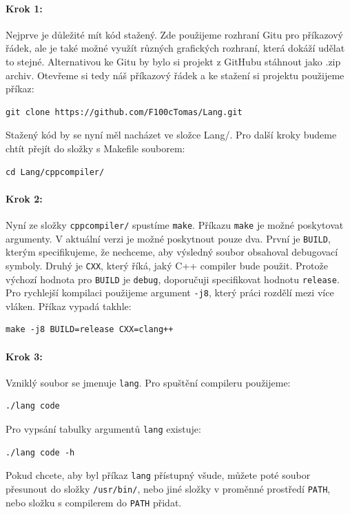 \documentclass[12pt, a4paper, titlepage, abstract=on]{scrreprt}
\begin{document}
\paragraph{Krok 1:}
Nejprve je důležité mít kód stažený. Zde použijeme rozhraní Gitu pro příkazový řádek, ale je také možné využít různých grafických rozhraní, která
dokáží udělat to stejné. Alternativou ke Gitu by bylo si projekt z GitHubu stáhnout jako .zip archiv. Otevřeme si tedy náš příkazový řádek a ke stažení si projektu použijeme příkaz:
\begin{verbatim}
git clone https://github.com/F100cTomas/Lang.git
\end{verbatim}
Stažený kód by se nyní měl nacházet ve složce Lang/. Pro další kroky budeme chtít přejít do složky s Makefile souborem:
\begin{verbatim}
cd Lang/cppcompiler/
\end{verbatim}
\paragraph{Krok 2:}
Nyní ze složky \texttt{cppcompiler/} spustíme \texttt{make}. Příkazu \texttt{make} je možné poskytovat argumenty. V aktuální verzi je možné
poskytnout pouze dva. První je \texttt{BUILD}, kterým specifikujeme, že nechceme, aby výsledný soubor obsahoval debugovací symboly.
Druhý je \texttt{CXX}, který říká, jaký C++ compiler bude použit. Protože výchozí hodnota pro \texttt{BUILD} je \texttt{debug}, doporučuji
specifikovat hodnotu \texttt{release}. Pro rychlejší kompilaci použijeme argument \texttt{-j8}, který práci rozdělí mezi více vláken. Příkaz
vypadá takhle:
\begin{verbatim}
make -j8 BUILD=release CXX=clang++
\end{verbatim}
\paragraph{Krok 3:}
Vzniklý soubor se jmenuje \texttt{lang}. Pro spuštění compileru použijeme:
\begin{verbatim}
./lang code
\end{verbatim}
Pro vypsání tabulky argumentů \texttt{lang} existuje:
\begin{verbatim}
./lang code -h
\end{verbatim}
Pokud chcete, aby byl příkaz \texttt{lang} přístupný všude, můžete poté soubor přesunout do složky \texttt{/usr/bin/}, nebo jiné složky v
proměnné prostředí \texttt{PATH}, nebo složku s compilerem do \texttt{PATH} přidat.
\end{document}
